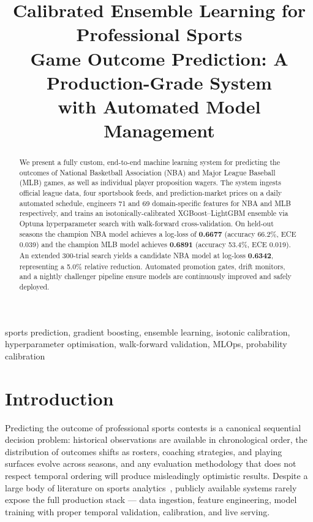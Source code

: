 \documentclass[conference]{IEEEtran}
\begin{document}
\title{Calibrated Ensemble Learning for Professional Sports\\
Game Outcome Prediction: A Production-Grade System\\
with Automated Model Management}

\author{
}

\maketitle

\begin{abstract}
We present a fully custom, end-to-end machine learning system for
predicting the outcomes of National Basketball Association (NBA) and
Major League Baseball (MLB) games, as well as individual player
proposition wagers.  The system ingests official league data, four
sportsbook feeds, and prediction-market prices on a daily automated
schedule, engineers 71 and 69 domain-specific features for NBA and MLB
respectively, and trains an isotonically-calibrated XGBoost–LightGBM
ensemble via Optuna hyperparameter search with walk-forward
cross-validation.  On held-out seasons the champion NBA model achieves a
log-loss of \textbf{0.6677} (accuracy 66.2\%, ECE 0.039) and the
champion MLB model achieves \textbf{0.6891} (accuracy 53.4\%, ECE
0.019).  An extended 300-trial search yields a candidate NBA model at
log-loss \textbf{0.6342}, representing a 5.0\% relative reduction.
Automated promotion gates, drift monitors, and a nightly challenger
pipeline ensure models are continuously improved and safely deployed.
\end{abstract}

\begin{IEEEkeywords}
sports prediction, gradient boosting, ensemble learning, isotonic
calibration, hyperparameter optimisation, walk-forward validation,
MLOps, probability calibration
\end{IEEEkeywords}

\section{Introduction}
\label{sec:intro}

Predicting the outcome of professional sports contests
is a canonical sequential decision problem: historical observations are
available in chronological order, the distribution of outcomes shifts as
rosters, coaching strategies, and playing surfaces evolve across
seasons, and any evaluation methodology that does not respect temporal
ordering will produce misleadingly optimistic results.  Despite a large
body of literature on sports analytics~\cite{haghighat2013, joseph2006,
tax2015, cao2012}, publicly available systems rarely expose the full
production stack — data ingestion, feature engineering, model training
with proper temporal validation, calibration, and live serving.
\end{document}
